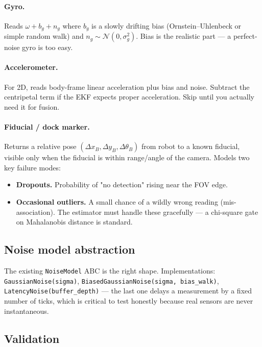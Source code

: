 \documentclass[11pt,a4paper]{article}
\newcommand{\code}[1]{\texttt{\small #1}}
\begin{document}
\paragraph{Gyro.} Reads $\omega + b_g + n_g$ where $b_g$ is a slowly drifting
bias (Ornstein--Uhlenbeck or simple random walk) and $n_g \sim
\mathcal{N}(0, \sigma_g^2)$. Bias is the realistic part --- a perfect-noise
gyro is too easy.

\paragraph{Accelerometer.} For 2D, reads body-frame linear acceleration
plus bias and noise. Subtract the centripetal term if the EKF expects
proper acceleration. Skip until you actually need it for fusion.

\paragraph{Fiducial / dock marker.} Returns a relative pose
$(\Delta x_B, \Delta y_B, \Delta \theta_B)$ from robot to a known fiducial,
visible only when the fiducial is within range/angle of the camera. Models
two key failure modes:
\begin{itemize}
    \item \textbf{Dropouts.} Probability of "no detection" rising near the
        FOV edge.
    \item \textbf{Occasional outliers.} A small chance of a wildly wrong
        reading (mis-association). The estimator must handle these
        gracefully --- a chi-square gate on Mahalanobis distance is
        standard.
\end{itemize}

\subsection*{Noise model abstraction}

The existing \code{NoiseModel} ABC is the right shape. Implementations:
\code{GaussianNoise(sigma)}, \code{BiasedGaussianNoise(sigma, bias\_walk)},
\code{LatencyNoise(buffer\_depth)} --- the last one delays a measurement
by a fixed number of ticks, which is critical to test honestly because
real sensors are never instantaneous.

\subsection*{Validation}
\end{document}
